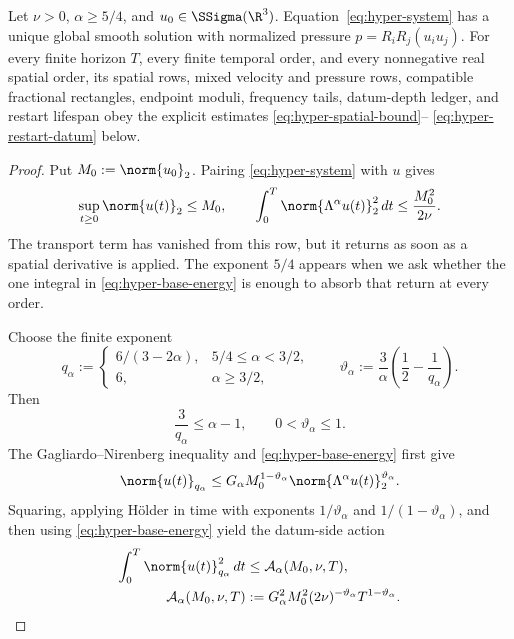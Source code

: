 \begin{theorem}
\label{thm:quantitative-hyperdissipative-jet}
Let \(\nu>0\), \(\alpha\ge5/4\), and
\(u_0\in\SSigma(\R^3)\).  Equation~\eqref{eq:hyper-system} has a unique
global smooth solution with normalized pressure
 \(p=R_iR_j(u_i u_j)\).  For every finite horizon \(T\), every finite
 temporal order, and every nonnegative real spatial order, its spatial rows, mixed
velocity and pressure rows, compatible fractional rectangles, endpoint
moduli, frequency tails, datum-depth ledger, and restart lifespan obey the
explicit estimates \eqref{eq:hyper-spatial-bound}--
\eqref{eq:hyper-restart-datum} below.
\end{theorem}

\begin{proof}
Put \(M_0:=\norm{u_0}_2\).  Pairing
\eqref{eq:hyper-system} with \(u\) gives
\begin{equation}
 \sup_{t\ge0}\norm{u(t)}_2\le M_0,
 \qquad
 \int_0^T\norm{\Lambda^\alpha u(t)}_2^2\,dt
 \le\frac{M_0^2}{2\nu}.
 \label{eq:hyper-base-energy}
\end{equation}
The transport term has vanished from this row, but it returns as soon as a
spatial derivative is applied.  The exponent \(5/4\) appears when we ask
whether the one integral in \eqref{eq:hyper-base-energy} is enough to absorb
that return at every order.

Choose the finite exponent
\begin{equation}
 q_\alpha:=
 \begin{cases}
  6/(3-2\alpha),&5/4\le\alpha<3/2,\\
  6,&\alpha\ge3/2,
 \end{cases}
 \qquad
 \vartheta_\alpha
 :=\frac3\alpha\left(\frac12-\frac1{q_\alpha}\right).
 \label{eq:hyper-q-choice}
\end{equation}
Then
\begin{equation}
 \frac3{q_\alpha}\le\alpha-1,
 \qquad 0<\vartheta_\alpha\le1.
 \label{eq:hyper-q-properties}
\end{equation}
The Gagliardo--Nirenberg inequality and
\eqref{eq:hyper-base-energy} first give
\begin{equation}
 \norm{u(t)}_{q_\alpha}
 \le G_\alpha M_0^{1-\vartheta_\alpha}
       \norm{\Lambda^\alpha u(t)}_2^{\vartheta_\alpha}.
 \label{eq:hyper-low-frequency-interpolation}
\end{equation}
Squaring, applying H\"older in time with exponents
\(1/\vartheta_\alpha\) and \(1/(1-\vartheta_\alpha)\), and then using
\eqref{eq:hyper-base-energy} yield the datum-side action
\begin{align}
 \int_0^T\norm{u(t)}_{q_\alpha}^2\,dt
 &\le\mathcal A_\alpha(M_0,\nu,T),
 \label{eq:hyper-lq-action}\\
 \mathcal A_\alpha(M_0,\nu,T)
 &:=G_\alpha^2M_0^2(2\nu)^{-\vartheta_\alpha}
       T^{1-\vartheta_\alpha}.
 \label{eq:hyper-lq-action-definition}
\end{align}


\end{proof}
